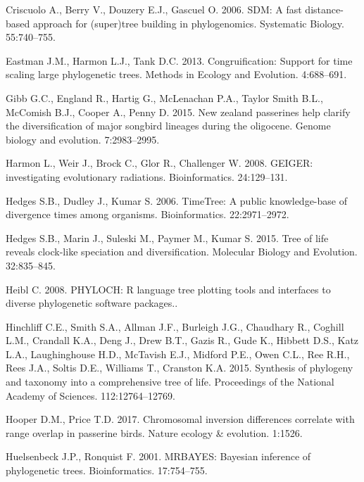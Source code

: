 \documentclass[]{article}
\begin{document}
\leavevmode\hypertarget{ref-Criscuolo2006}{}%
Criscuolo A., Berry V., Douzery E.J., Gascuel O. 2006. SDM: A fast distance-based approach for (super)tree building in phylogenomics. Systematic Biology. 55:740--755.

\leavevmode\hypertarget{ref-Eastman2013}{}%
Eastman J.M., Harmon L.J., Tank D.C. 2013. Congruification: Support for time scaling large phylogenetic trees. Methods in Ecology and Evolution. 4:688--691.

\leavevmode\hypertarget{ref-gibb2015new}{}%
Gibb G.C., England R., Hartig G., McLenachan P.A., Taylor Smith B.L., McComish B.J., Cooper A., Penny D. 2015. New zealand passerines help clarify the diversification of major songbird lineages during the oligocene. Genome biology and evolution. 7:2983--2995.

\leavevmode\hypertarget{ref-Harmon2008}{}%
Harmon L., Weir J., Brock C., Glor R., Challenger W. 2008. GEIGER: investigating evolutionary radiations. Bioinformatics. 24:129--131.

\leavevmode\hypertarget{ref-Hedges2006}{}%
Hedges S.B., Dudley J., Kumar S. 2006. TimeTree: A public knowledge-base of divergence times among organisms. Bioinformatics. 22:2971--2972.

\leavevmode\hypertarget{ref-Hedges2015}{}%
Hedges S.B., Marin J., Suleski M., Paymer M., Kumar S. 2015. Tree of life reveals clock-like speciation and diversification. Molecular Biology and Evolution. 32:835--845.

\leavevmode\hypertarget{ref-Heibl2008}{}%
Heibl C. 2008. PHYLOCH: R language tree plotting tools and interfaces to diverse phylogenetic software packages..

\leavevmode\hypertarget{ref-Hinchliff2015}{}%
Hinchliff C.E., Smith S.A., Allman J.F., Burleigh J.G., Chaudhary R., Coghill L.M., Crandall K.A., Deng J., Drew B.T., Gazis R., Gude K., Hibbett D.S., Katz L.A., Laughinghouse H.D., McTavish E.J., Midford P.E., Owen C.L., Ree R.H., Rees J.A., Soltis D.E., Williams T., Cranston K.A. 2015. Synthesis of phylogeny and taxonomy into a comprehensive tree of life. Proceedings of the National Academy of Sciences. 112:12764--12769.

\leavevmode\hypertarget{ref-hooper2017chromosomal}{}%
Hooper D.M., Price T.D. 2017. Chromosomal inversion differences correlate with range overlap in passerine birds. Nature ecology \& evolution. 1:1526.

\leavevmode\hypertarget{ref-Huelsenbeck2001}{}%
Huelsenbeck J.P., Ronquist F. 2001. MRBAYES: Bayesian inference of phylogenetic trees. Bioinformatics. 17:754--755.
\end{document}
